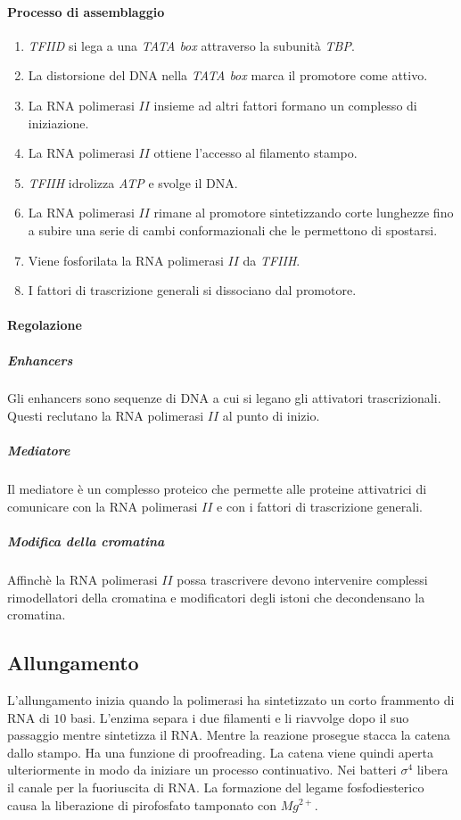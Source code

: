 			\paragraph{Processo di assemblaggio}
			\begin{multicols}{2}
				\begin{enumerate}
					\item \emph{TFIID} si lega a una \emph{TATA box} attraverso la subunit\`a \emph{TBP}.
					\item La distorsione del DNA nella \emph{TATA box} marca il promotore come attivo.
					\item La RNA polimerasi $II$ insieme ad altri fattori formano un complesso di iniziazione.
					\item La RNA polimerasi $II$ ottiene l'accesso al filamento stampo.
					\item \emph{TFIIH} idrolizza \emph{ATP} e svolge il DNA.
					\item La RNA polimerasi $II$ rimane al promotore sintetizzando corte lunghezze fino a subire una serie di cambi conformazionali che le permettono di spostarsi.
					\item Viene fosforilata la RNA polimerasi $II$  da \emph{TFIIH}.
					\item I fattori di trascrizione generali si dissociano dal promotore.
				\end{enumerate}
			\end{multicols}

			\paragraph{Regolazione}

				\subparagraph{Enhancers}
				Gli enhancers sono sequenze di DNA a cui si legano gli attivatori trascrizionali.
				Questi reclutano la RNA polimerasi $II$ al punto di inizio.

				\subparagraph{Mediatore}
				Il mediatore \`e un complesso proteico che permette alle proteine attivatrici di comunicare con la RNA polimerasi $II$ e con i fattori di trascrizione generali.

				\subparagraph{Modifica della cromatina}
				Affinch\`e la RNA polimerasi $II$ possa trascrivere devono intervenire complessi rimodellatori della cromatina e modificatori degli istoni che decondensano la cromatina.

	\subsection{Allungamento}
	L'allungamento inizia quando la polimerasi ha sintetizzato un corto frammento di RNA di $10$ basi.
	L'enzima separa i due filamenti e li riavvolge dopo il suo passaggio mentre sintetizza il RNA.
	Mentre la reazione prosegue stacca la catena dallo stampo.
	Ha una funzione di proofreading.
	La catena viene quindi aperta ulteriormente in modo da iniziare un processo continuativo.
	Nei batteri $\sigma^4$  libera il canale per la fuoriuscita di RNA.
	La formazione del legame fosfodiesterico causa la liberazione di pirofosfato tamponato con \emph{$Mg^{2+}$}.

